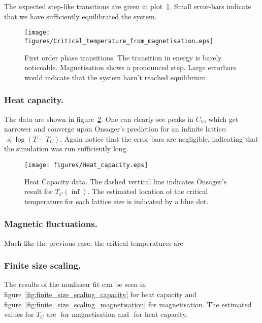 \documentclass[12pt]{article}
\begin{document}
The expected step-like transitions are given in plot~\ref{fig:first_order_transitions}. Small error-bars indicate that we have sufficiently equilibrated the system. 

\begin{figure}[p]
  \texttt{[image: figures/Critical\_temperature\_from\_magnetisation.eps]}
  \caption{First order phase transitions. The transition in energy is barely noticeable. Magnetisation shows a pronounced step. Large errorbars would indicate that  the system hasn't reached equilibrium.}\label{fig:first_order_transitions}
\end{figure}

\subsubsection{Heat capacity.}

The data are shown in figure~\ref{fig:capacity_plot}. One can clearly see peaks in \(C_V\), which get narrower and converge upon Onsager's prediction for an infinite lattice: \( \propto \log ( T - T_C)\). Again notice that the error-bars are negligible, indicating that the simulation was run sufficiently long. 

\begin{figure}[t]
  \texttt{[image: figures/Heat\_capacity.eps]}
  \caption[capacity_plot]{Heat Capacity data. The dashed vertical line indicates Onsager's result for \(T_C(\inf)\). The estimated location of the critical temperature for each lattice size is indicated by a blue dot. }\label{fig:capacity_plot}
\end{figure}

\subsubsection{Magnetic  fluctuations.}

Much like the previous case, the critical temperatures are 

\subsubsection{Finite size scaling.}

The results of the nonlinear fit can be seen in figure~\ref{fig:finite_size_scaling_capacity} for heat capacity and figure~\ref{fig:finite_size_scaling_magnetisation} for magnetisation. The estimated values for \(T_C\) are \( \) for magnetisation and \( \) for heat capacity.
\end{document}
